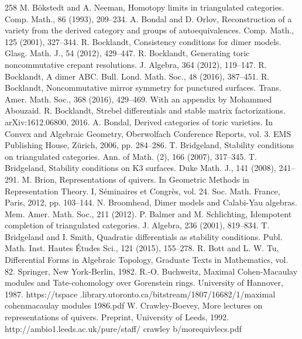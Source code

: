 \begin{thebibliography}{258}
\hypertarget{ref:31}{} M. Bökstedt and A. Neeman, Homotopy limits in triangulated categories. Comp. Math., 86 (1993), 209–234.
\hypertarget{ref:32}{} A. Bondal and D. Orlov, Reconstruction of a variety from the derived category and groups of autoequivalences. Comp. Math., 125 (2001), 327–344.
\hypertarget{ref:33}{} R. Bocklandt, Consistency conditions for dimer models. Glasg. Math. J., 54 (2012), 429–447.
\hypertarget{ref:34}{} R. Bocklandt, Generating toric noncommutative crepant resolutions. J. Algebra, 364 (2012), 119–147.
\hypertarget{ref:35}{} R. Bocklandt, A dimer ABC. Bull. Lond. Math. Soc., 48 (2016), 387–451.
\hypertarget{ref:36}{} R. Bocklandt, Noncommutative mirror symmetry for punctured surfaces. Trans. Amer. Math. Soc., 368 (2016), 429–469. With an appendix by Mohammed Abouzaid.
\hypertarget{ref:37}{} R. Bocklandt, Strebel differentials and stable matrix factorizations. arXiv:1612.06800, 2016.
\hypertarget{ref:38}{} A. Bondal, Derived categories of toric varieties. In Convex and Algebraic Geometry, Oberwolfach Conference Reports, vol. 3. EMS Publishing House, Zürich, 2006, pp. 284–286.
\hypertarget{ref:39}{} T. Bridgeland, Stability conditions on triangulated categories. Ann. of Math. (2), 166 (2007), 317–345.
\hypertarget{ref:40}{} T. Bridgeland, Stability conditions on K3 surfaces. Duke Math. J., 141 (2008), 241–291.
\hypertarget{ref:41}{} M. Brion, Representations of quivers. In Geometric Methods in Representation Theory. I, Séminaires et Congrès, vol. 24. Soc. Math. France, Paris, 2012, pp. 103–144.
\hypertarget{ref:42}{} N. Broomhead, Dimer models and Calabi-Yau algebras. Mem. Amer. Math. Soc., 211 (2012).
\hypertarget{ref:43}{} P. Balmer and M. Schlichting, Idempotent completion of triangulated categories. J. Algebra, 236 (2001), 819–834.
\hypertarget{ref:44}{} T. Bridgeland and I. Smith, Quadratic differentials as stability conditions. Publ. Math. Inst. Hautes Études Sci., 121 (2015), 155–278.
\hypertarget{ref:45}{} R. Bott and L. W. Tu, Differential Forms in Algebraic Topology, Graduate Texts in Mathematics, vol. 82. Springer, New York-Berlin, 1982.
\hypertarget{ref:46}{} R.-O. Buchweitz, Maximal Cohen-Macaulay modules and Tate-cohomology over Gorenstein rings. University of Hannover, 1987. https://tspace .library.utoronto.ca/bitstream/1807/16682/1/maximal cohenmacaulay modules 1986.pdf
\hypertarget{ref:47}{} W. Crawley-Boevey, More lectures on representations of quivers. Preprint, University of Leeds, 1992. http://ambio1.leeds.ac.uk/pure/staff/ crawley b/morequivlecs.pdf

\end{thebibliography}
